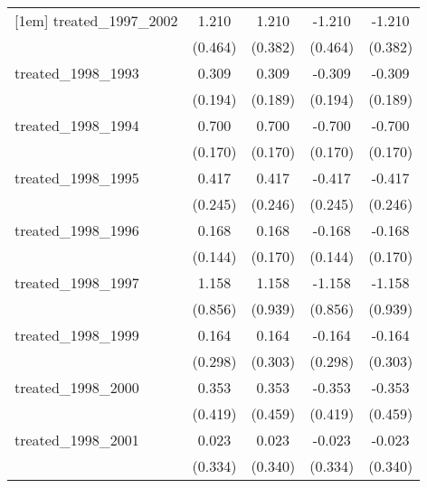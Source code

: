 {\begin{tabular}{l*{4}{c}}
[1em]
treated\_1997\_2002&       1.210\sym{**} &       1.210\sym{**} &      -1.210\sym{**} &      -1.210\sym{**} \\
            &     (0.464)         &     (0.382)         &     (0.464)         &     (0.382)         \\
[1em]
treated\_1998\_1993&       0.309         &       0.309         &      -0.309         &      -0.309         \\
            &     (0.194)         &     (0.189)         &     (0.194)         &     (0.189)         \\
[1em]
treated\_1998\_1994&       0.700\sym{***}&       0.700\sym{***}&      -0.700\sym{***}&      -0.700\sym{***}\\
            &     (0.170)         &     (0.170)         &     (0.170)         &     (0.170)         \\
[1em]
treated\_1998\_1995&       0.417         &       0.417         &      -0.417         &      -0.417         \\
            &     (0.245)         &     (0.246)         &     (0.245)         &     (0.246)         \\
[1em]
treated\_1998\_1996&       0.168         &       0.168         &      -0.168         &      -0.168         \\
            &     (0.144)         &     (0.170)         &     (0.144)         &     (0.170)         \\
[1em]
treated\_1998\_1997&       1.158         &       1.158         &      -1.158         &      -1.158         \\
            &     (0.856)         &     (0.939)         &     (0.856)         &     (0.939)         \\
[1em]
treated\_1998\_1999&       0.164         &       0.164         &      -0.164         &      -0.164         \\
            &     (0.298)         &     (0.303)         &     (0.298)         &     (0.303)         \\
[1em]
treated\_1998\_2000&       0.353         &       0.353         &      -0.353         &      -0.353         \\
            &     (0.419)         &     (0.459)         &     (0.419)         &     (0.459)         \\
[1em]
treated\_1998\_2001&       0.023         &       0.023         &      -0.023         &      -0.023         \\
            &     (0.334)         &     (0.340)         &     (0.334)         &     (0.340)         \\

\end{tabular}}
